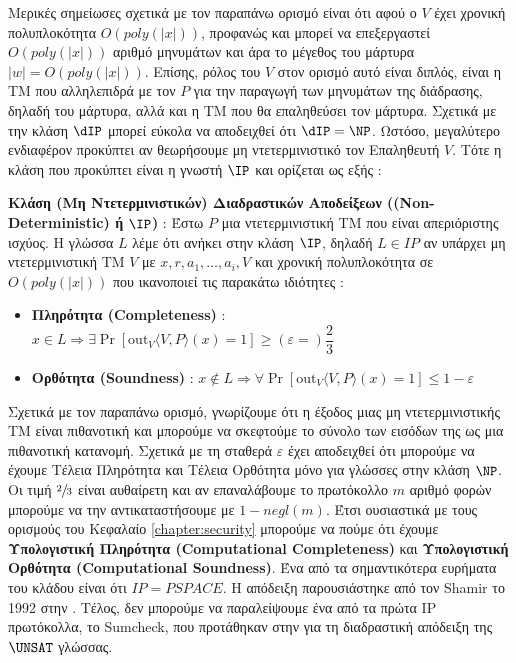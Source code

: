 Μερικές σημείωσες σχετικά με τον παραπάνω ορισμό είναι ότι αφού ο $V$ έχει χρονική πολυπλοκότητα $O(poly(|x|))$, προφανώς και μπορεί να επεξεργαστεί $O(poly(|x|))$ αριθμό μηνυμάτων και άρα το μέγεθος του μάρτυρα $|w|=O(poly(|x|))$. Επίσης, ρόλος του $V$ στον ορισμό αυτό είναι διπλός, είναι η ΤΜ που αλληλεπιδρά με τον $P$ για την παραγωγή των μηνυμάτων της διάδρασης, δηλαδή του μάρτυρα, αλλά και η ΤΜ που θα επαληθεύσει τον μάρτυρα. Σχετικά με την κλάση  $\dIP$ μπορεί εύκολα να αποδειχθεί ότι $\dIP = \NP$. Ωστόσο, μεγαλύτερο ενδιαφέρον προκύπτει αν θεωρήσουμε μη ντετερμινιστικό τον Επαληθευτή $V$. Τότε η κλάση που προκύπτει είναι η γνωστή $\IP$ και ορίζεται ως εξής :

\begin{definition}
\textbf{Κλάση (Μη Ντετερμινιστικών) Διαδραστικών Αποδείξεων ((Non-Deter\-ministic)  ή $\IP$)} : Έστω $P$ μια ντετερμινιστική ΤΜ που είναι απεριόριστης ισχύος. Η γλώσσα $L$ λέμε ότι ανήκει στην κλάση $\IP$, δηλαδή $L \in IP$ αν υπάρχει μη ντετερμινιστική ΤΜ $V$ με $x, r, a_{1}, \ldots, a_{i}, V$ και χρονική πολυπλοκότητα σε $O(poly(|x|))$ που ικανοποιεί τις παρακάτω ιδιότητες :
\begin{itemize}
    \item \textbf{Πληρότητα (Completeness)} : $x \in L \Rightarrow \exists \operatorname{Pr}\left[\text {out}_{V}\langle V, P\rangle(x)=1\right] \geq (ε=) \dfrac{2}{3}$
    \item \textbf{Ορθότητα (Soundness)} : $x \notin L \Rightarrow \forall \operatorname{Pr}\left[\text {out}_{V}\langle V, P\rangle(x)=1\right] \leq 1 - ε$
\end{itemize}
\end{definition}

Σχετικά με τον παραπάνω ορισμό, γνωρίζουμε ότι η έξοδος μιας μη ντετερμινιστικής ΤΜ είναι πιθανοτική και μπορούμε να σκεφτούμε το σύνολο των εισόδων της ως μια πιθανοτική κατανομή. Σχετικά με τη σταθερά $ε$ έχει αποδειχθεί ότι μπορούμε να έχουμε Τέλεια Πληρότητα και Τέλεια Ορθότητα μόνο για γλώσσες στην κλάση $\NP$. Οι τιμή $\sfrac{2}{3}$ είναι αυθαίρετη και αν επαναλάβουμε το πρωτόκολλο $m$ αριθμό φορών μπορούμε να την αντικαταστήσουμε με $1-negl(m)$. Έτσι ουσιαστικά με τους ορισμούς του Κεφαλαίο \ref{chapter:security} μπορούμε να πούμε ότι έχουμε \textbf{Υπολογιστική Πληρότητα (Computational Completeness)} και \textbf{Υπολογιστική Ορθότητα (Computational Soundness)}. Ένα από τα σημαντικότερα ευρήματα του κλάδου είναι ότι $IP=PSPACE$. Η απόδειξη παρουσιάστηκε από τον Shamir το 1992 στην \cite{shamir1992ip}. Τέλος, δεν μπορούμε να παραλείψουμε ένα από τα πρώτα IP πρωτόκολλα, το Sumcheck, που προτάθηκαν στην \cite{lund1992algebraic} για τη διαδραστική απόδειξη της $\UNSAT$ γλώσσας.